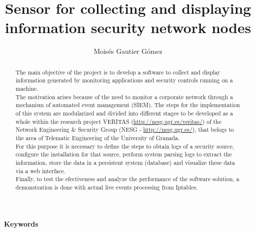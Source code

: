 \documentclass{article}
\begin{document}
\title{Sensor for collecting and displaying information security network nodes}
\author{Moisés Gautier Gómez}
\date{ }
\maketitle
\begin{center}
\small{\textbf{Keywords}}
\end{center}

\begin{abstract}
  The main objective of the project is to develop a software to collect and display information generated by monitoring applications and security controls running on a machine.\\

  The motivation arises because of the need to monitor a corporate network through a mechanism of automated event management (SIEM). The steps for the implementation of this system are modularized and divided into different stages to be developed as a whole within the research project VERITAS (\url{http://nesg.ugr.es/veritas/}) of the Network Engineering \& Security Group (NESG - \url{http://nesg.ugr.es/}), that belogs to the area of Telematic Engineering of the University of Granada.\\

  For this purpose it is necessary to define the steps to obtain logs of a security source, configure the installation for that source, perform system parsing logs to extract the information, store the data in a persistent system (database) and visualize these data via a web interface.\\

  Finally, to test the efectiveness and analyze the performance of the software solution, a demonstration is done with actual live events processing from Iptables.\\
\end{abstract}
\end{document}
